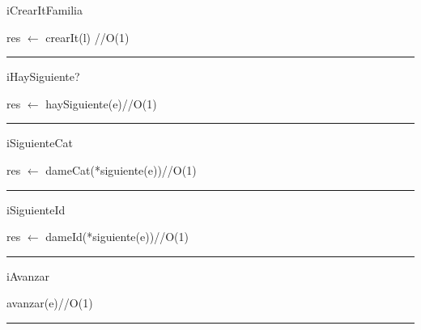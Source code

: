 \begin{algorithm}[H]
\caption{iCrearItFamilia}
\begin{algorithmic}[1]
\State res $\gets$ crearIt(l) \hfill //O(1)
\EndFunction 
\end{algorithmic}
\hrule
{}
\end{algorithm}

\begin{algorithm}[H]
\caption{iHaySiguiente?}
\begin{algorithmic}[1]
\state res $\gets$ haySiguiente(e)\hfill //O(1)
\EndFunction 
\end{algorithmic}
\hrule
{}
\end{algorithm}

\begin{algorithm}[H]
\caption{iSiguienteCat}
\begin{algorithmic}[1]
\state res $\gets$ dameCat(*siguiente(e))\hfill //O(1)
\EndFunction 
\end{algorithmic}
\hrule
{}
\end{algorithm}


\begin{algorithm}[H]
\caption{iSiguienteId}
\begin{algorithmic}[1]
\state res $\gets$ dameId(*siguiente(e))\hfill //O(1)
\EndFunction 
\end{algorithmic}
\hrule
{}
\end{algorithm}

\begin{algorithm}[H]
\caption{iAvanzar}
\begin{algorithmic}[1]
\state avanzar(e)\hfill //O(1)
\EndFunction 
\end{algorithmic}
\hrule
{}
\end{algorithm}
